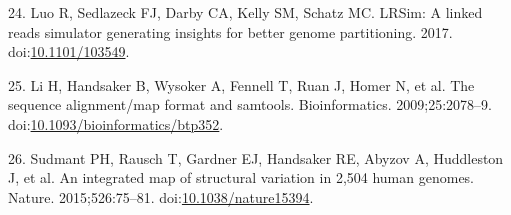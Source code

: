 \documentclass{bmcart}
\begin{document}
\begin{backmatter}
\leavevmode\hypertarget{ref-Luo_2017}{}%
24. Luo R, Sedlazeck FJ, Darby CA, Kelly SM, Schatz MC. LRSim: A linked reads simulator generating insights for better genome partitioning. 2017. doi:\href{https://doi.org/10.1101/103549}{10.1101/103549}.

\leavevmode\hypertarget{ref-Li_2009}{}%
25. Li H, Handsaker B, Wysoker A, Fennell T, Ruan J, Homer N, et al. The sequence alignment/map format and samtools. Bioinformatics. 2009;25:2078--9. doi:\href{https://doi.org/10.1093/bioinformatics/btp352}{10.1093/bioinformatics/btp352}.

\leavevmode\hypertarget{ref-Sudmant_2015}{}%
26. Sudmant PH, Rausch T, Gardner EJ, Handsaker RE, Abyzov A, Huddleston J, et al. An integrated map of structural variation in 2,504 human genomes. Nature. 2015;526:75--81. doi:\href{https://doi.org/10.1038/nature15394}{10.1038/nature15394}.

\end{backmatter}
\end{document}
